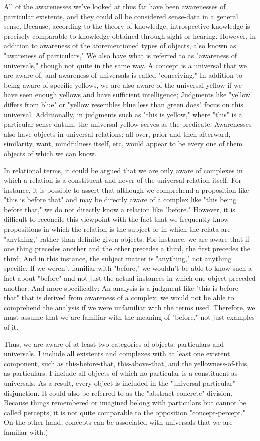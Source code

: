 \documentclass[a4paper,12pt]{book}[2004/02/16]
\theoremstyle{ilemma}
\theoremstyle{itheorem}
\theoremstyle{iother}
\theoremstyle{icorollary}
\theoremstyle{numcorollary}
\theoremstyle{idefinition}
\begin{document}
All of the awarenesses we've looked at thus far have been awarenesses of particular existents, and they could all be considered sense-data in a general sense. Because, according to the theory of knowledge, introspective knowledge is precisely comparable to knowledge obtained through sight or hearing. However, in addition to awareness of the aforementioned types of objects, also known as "awareness of particulars," We also have what is referred to as "awareness of universals," though not quite in the same way. A concept is a universal that we are aware of, and awareness of universals is called "conceiving." In addition to being aware of specific yellows, we are also aware of the universal yellow if we have seen enough yellows and have sufficient intelligence; Judgments like "yellow differs from blue" or "yellow resembles blue less than green does" focus on this universal. Additionally, in judgments such as "this is yellow," where "this" is a particular sense-datum, the universal yellow serves as the predicate. Awarenesses also have objects in universal relations; all over,
prior and then afterward, similarity, want, mindfulness itself, etc,
would appear to be every one of them objects of which we can know.

In relational terms, it could be argued that we are only aware of complexes in which a relation is a constituent and never of the universal relation itself. For instance, it is possible to assert that although we comprehend a proposition like "this is before that" and may be directly aware of a complex like "this being before that," we do not directly know a relation like "before." However, it is difficult to reconcile this viewpoint with the fact that we frequently know propositions in which the relation is the subject or in which the relata are "anything," rather than definite given objects. For instance, we are aware that if one thing precedes another and the other precedes a third, the first precedes the third; And in this instance, the subject matter is "anything," not anything specific. If we weren't familiar with "before," we wouldn't be able to know such a fact about "before" and not just the actual instances in which one object preceded another. And more specifically: An analysis is a judgment like "this is before that" that is derived from awareness of a complex; we would not be able to comprehend the analysis if we were unfamiliar with the terms used. Therefore, we must assume that we are familiar with the meaning of "before," not just examples of it.

Thus, we are aware of at least two categories of objects: particulars and universals. I include all existents and complexes with at least one existent component, such as this-before-that, this-above-that, and the yellowness-of-this, as particulars. I include all objects of which no particular is a constituent as universals. As a result, every object is included in the "universal-particular" disjunction. It could also be referred to as the "abstract-concrete" division. Because things remembered or imagined belong with particulars but cannot be called percepts, it is not quite comparable to the opposition "concept-percept." On the other hand, concepts can be associated with universals that we are familiar with.)
\end{document}
